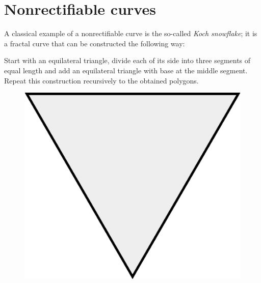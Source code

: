 \section*{Nonrectifiable curves}
A classical example of a nonrectifiable curve is the so-called \emph{Koch snowflake};
it is a fractal curve that can be constructed the following way:

Start with an equilateral triangle, divide each of its side into three segments of equal length and add an equilateral triangle with base at the middle segment.
Repeat this construction recursively to the obtained polygons.
\begin{figure}[h!]
\begin{minipage}{.24\textwidth}
\centering
\vskip5.9mm
\includegraphics[scale=.15]{pics/Koch_Snowflake-0}
\end{minipage}
\hfill
\begin{minipage}{.24\textwidth}
\centering

\end{minipage}
\end{figure}
